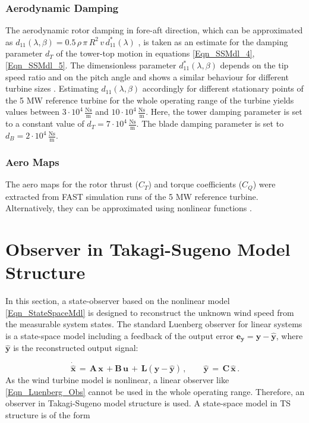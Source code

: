 \documentclass[a4paper]{article}
\newcommand{\xhat}{\widehat{x}}
\newcommand{\yhat}{\widehat{y}}
\newcommand{\xhatP}{\dot{\widehat{x}}}
\newcommand{\B}[1]{\mathbf{#1}}
\begin{document}
\subsubsection{\label{Sec_AeroDamping}Aerodynamic Damping}

The aerodynamic rotor damping in fore-aft direction, which can be approximated as 
\newline $d_{11}\left(\lambda, \beta\right) = 0.5 \, \rho \, \pi \, R^2 \, v \, d_{11}^*\left(\lambda\right)$ \cite{Kaiser:2000}, is taken as an estimate for the damping parameter $d_T$ of the tower-top motion in equations \eqref{Eqn_SSMdl_4}, \eqref{Eqn_SSMdl_5}. The dimensionless parameter $d_{11}^*\left(\lambda,\beta\right)$ depends on the tip speed ratio and on the pitch angle and shows a similar behaviour for different turbine sizes \cite{Kaiser:2000}. Estimating $d_{11}\left(\lambda,\beta\right)$ accordingly for different stationary points of the 5 MW reference turbine for the whole operating range of the turbine yields values between
$3 \cdot 10^4 \,\frac{\text{Ns}}{\text{m}}$ and $10 \cdot 10^4 \, \frac{\text{Ns}}{\text{m}}$.
Here, the tower damping parameter is set to a constant value of $d_T = 7 \cdot 10^4 \,\frac{\text{Ns}}{\text{m}}$. The blade damping parameter is set to $d_B  = 2 \cdot 10^4 \,\frac{\text{Ns}}{\text{m}}$.

\subsubsection{\label{Sec_AeroMaps}Aero Maps}

The aero maps for the rotor thrust ($C_T$) and torque coefficients ($C_Q$) were extracted from FAST simulation runs of the 5 MW reference turbine.
Alternatively, they can be approximated using nonlinear functions \cite{Georg:Fuzz2012}.


\section{\label{Sec_TSObs}Observer in Takagi-Sugeno Model Structure}

In this section, a state-observer based on the nonlinear model \eqref{Eqn_StateSpaceMdl} is designed to reconstruct the unknown wind speed from the measurable system states. The standard Luenberg observer for linear systems is a state-space model including a feedback of the output error $\B{e}_\B{y} = \B{y} - \B{\yhat}$, where $\B{\yhat}$ is the reconstructed output signal:

\begin{equation}
 \B{\xhatP} \, = \, \B{A} \, \B{x} \, + \B{B \, u} \, + \, \B{L} \left(\B{y} - \B{\yhat}\right) \, , \qquad
 \B{\yhat}	 \, = \, \B{C \, \xhat} \, .
\label{Eqn_Luenberg_Obs}
\end{equation}
\newline As the wind turbine model is nonlinear, a linear observer like \eqref{Eqn_Luenberg_Obs} cannot be used in the whole operating range. Therefore, an observer in Takagi-Sugeno model structure is used.
\newline A state-space model in TS structure is of the form
\end{document}
